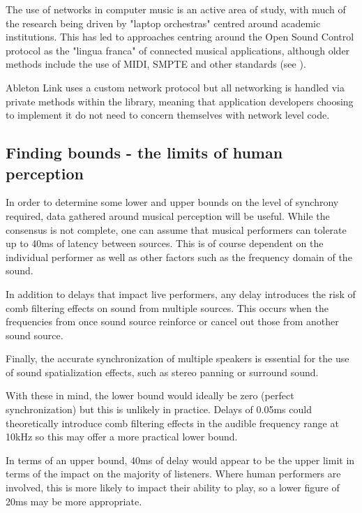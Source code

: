 \documentclass[11pt]{article} %
\theoremstyle{plain}
\theoremstyle{definition}
\begin{document}
The use of networks in computer music is an active area of study, with much of
the research being driven by "laptop orchestras"\cite{trueman2007laptop}
centred around academic institutions. This has led to approaches centring
around the Open Sound Control
protocol\cite{wright2005open}\cite{madgwick2015simple}\cite{narveson2013landini}
as the "lingua franca" of connected musical applications, although older
methods include the use of MIDI, SMPTE and other standards (see \cite{goltz2018ableton}).

Ableton Link uses a custom network protocol but all networking is handled via
private methods within the library, meaning that application developers
choosing to implement it do not need to concern themselves with network level code.

\subsection{Finding bounds - the limits of human perception}

In order to determine some lower and upper bounds on the level of synchrony
required, data gathered around musical perception will be useful. While the
consensus is not complete\cite{greeff2016influence}, one can assume that
musical performers can tolerate up to 40ms of latency between sources. This is
of course dependent on the individual performer as well as other factors such
as the frequency domain of the sound.

In addition to delays that impact live performers, any delay introduces the
risk of comb filtering effects on sound from multiple sources. This occurs when
the frequencies from once sound source reinforce or cancel out those from
another sound source.

Finally, the accurate synchronization of multiple speakers is essential for the
use of sound spatialization effects, such as stereo panning or surround sound.

With these in mind, the lower bound would ideally be zero (perfect
synchronization) but this is unlikely in practice. Delays of 0.05ms could
theoretically introduce comb filtering effects in the audible frequency range
at 10kHz\cite{lester2007effects} so this may offer a more practical lower bound.

In terms of an upper bound, 40ms of delay would appear to be the upper limit in
terms of the impact on the majority of listeners. Where human performers are
involved, this is more likely to impact their ability to play, so a lower
figure of 20ms may be more appropriate\cite{chafe2004network}.
\end{document}
